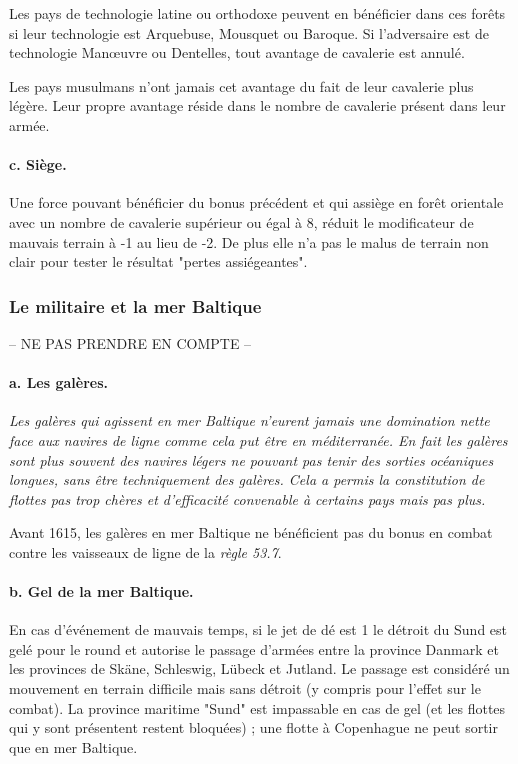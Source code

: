 Les pays de technologie latine ou orthodoxe peuvent  en bénéficier dans ces forêts si 
leur technologie est Arquebuse, Mousquet ou Baroque.
Si l'adversaire est de technologie Man\oe uvre ou Dentelles, tout avantage
de cavalerie est annulé.

Les pays musulmans n'ont jamais cet avantage du fait de leur cavalerie
plus légère. Leur propre avantage réside dans le nombre de cavalerie
présent dans leur armée.

\paragraph{c. Siège.} 
Une force pouvant bénéficier du bonus précédent et
qui assiège en forêt orientale avec un nombre 
de cavalerie supérieur ou égal à 8,
réduit le modificateur de mauvais terrain à -1 au lieu de -2. 
De plus elle n'a pas le malus de terrain non clair pour
tester le résultat "pertes assiégeantes".

\subsubsection{Le militaire et la mer Baltique}
-- NE PAS PRENDRE EN COMPTE --


\paragraph{a. Les galères.}
\textit{
Les galères qui agissent en mer Baltique n'eurent jamais une domination
nette face aux navires de ligne comme cela put être en méditerranée.
En fait les galères sont plus souvent des navires légers ne pouvant pas
tenir des sorties océaniques longues, sans être techniquement des galères.
Cela a permis la constitution de flottes pas trop chères et d'efficacité
convenable à certains pays mais pas plus.}

Avant 1615, les galères en mer Baltique ne bénéficient pas du bonus en combat 
contre les vaisseaux de ligne de la \textit{règle 53.7}.

\paragraph{b. Gel de la mer Baltique.}
En cas d'événement de mauvais temps, si le jet de dé est 1 le détroit du Sund est
gelé pour le round et autorise le passage d'armées entre la province Danmark et 
les provinces de Skäne, Schleswig,
Lübeck et Jutland. Le passage est considéré un mouvement en terrain difficile mais
sans détroit (y compris pour l'effet sur le combat).
La province maritime "Sund" est impassable en cas de gel
(et les flottes qui y sont présentent restent bloquées) ;
une flotte à Copenhague ne peut sortir que en mer Baltique.

